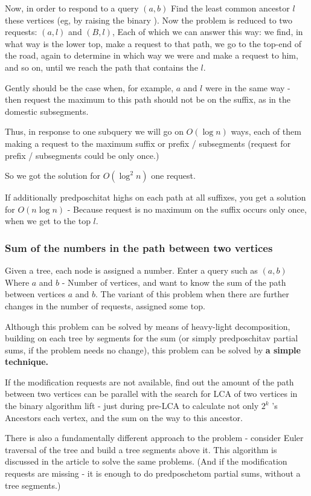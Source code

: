 Now, in order to respond to a query $(a, b)$ Find the least common ancestor $l$ these vertices (eg, by raising the binary ). Now the problem is reduced to two requests: $(a, l)$ and $(B, l)$, Each of which we can answer this way: we find, in what way is the lower top, make a request to that path, we go to the top-end of the road, again to determine in which way we were and make a request to him, and so on, until we reach the path that contains the $l$.

Gently should be the case when, for example, $a$ and $l$ were in the same way - then request the maximum to this path should not be on the suffix, as in the domestic subsegments.

Thus, in response to one subquery we will go on $O (\log n)$ ways, each of them making a request to the maximum suffix or prefix / subsegments (request for prefix / subsegments could be only once.)

So we got the solution for $O (\log ^ 2 n)$ one request.

If additionally predposchitat highs on each path at all suffixes, you get a solution for $O (n \log n)$ - Because request is no maximum on the suffix occurs only once, when we get to the top $l$.

\subsubsection{ Sum of the numbers in the path between two vertices }

Given a tree, each node is assigned a number. Enter a query such as $(a, b)$ Where $a$ and $b$ - Number of vertices, and want to know the sum of the path between vertices $a$ and $b$. The variant of this problem when there are further changes in the number of requests, assigned some top.

Although this problem can be solved by means of heavy-light decomposition, building on each tree by segments for the sum (or simply predposchitav partial sums, if the problem needs no change), this problem can be solved by \textbf{a simple technique.}

If the modification requests are not available, find out the amount of the path between two vertices can be parallel with the search for LCA of two vertices in the binary algorithm lift - just during pre-LCA to calculate not only $2 ^ k$ 's Ancestors each vertex, and the sum on the way to this ancestor.

There is also a fundamentally different approach to the problem - consider Euler traversal of the tree and build a tree segments above it. This algorithm is discussed in the article to solve the same problems. (And if the modification requests are missing - it is enough to do predposchetom partial sums, without a tree segments.)


